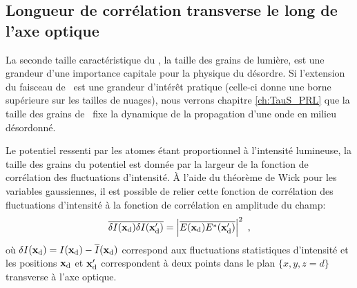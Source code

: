 \subsection{Longueur de corrélation transverse le long de l'axe optique}
\label{sc:correlation_transverse}
La seconde taille caractéristique du \speckle , la taille des grains de lumière, est une grandeur d'une importance capitale pour la physique du désordre. Si l'extension du faisceau de \speckle\ est une grandeur d'intérêt pratique (celle-ci donne une borne supérieure sur les tailles de nuages), nous verrons chapitre \ref{ch:TauS_PRL} que la taille des grains de \speckle\ fixe la dynamique de la propagation d'une onde en milieu désordonné.

Le potentiel ressenti par les atomes étant proportionnel à l'intensité lumineuse, la taille des grains du potentiel est donnée par la largeur de la fonction de corrélation des fluctuations d'intensité. À l'aide du théorème de Wick pour les variables gaussiennes, il est possible de relier cette fonction de corrélation des fluctuations d'intensité à la fonction de corrélation en amplitude du champ:
\begin{equation}
\overline{\delta I(\mathbf{x}_{\mathrm{d}}) \delta I(\mathbf{x}_{\mathrm{d}}')} = \left| \overline{E(\mathbf{x}_{\mathrm{d}})E^*(\mathbf{x}_{\mathrm{d}}')} \right|^2 \text{ ,}
\end{equation}
où $\delta I(\mathbf{x}_{\mathrm{d}})=I(\mathbf{x}_{\mathrm{d}})-\overline{I}(\mathbf{x}_{\mathrm{d}})$ correspond aux fluctuations statistiques d'intensité et les positions $\mathbf{x}_{\mathrm{d}}$ et $\mathbf{x}_{\mathrm{d}}'$ correspondent à deux points dans le plan $\lbrace x,y,z=d\rbrace$ transverse à l'axe optique. 


